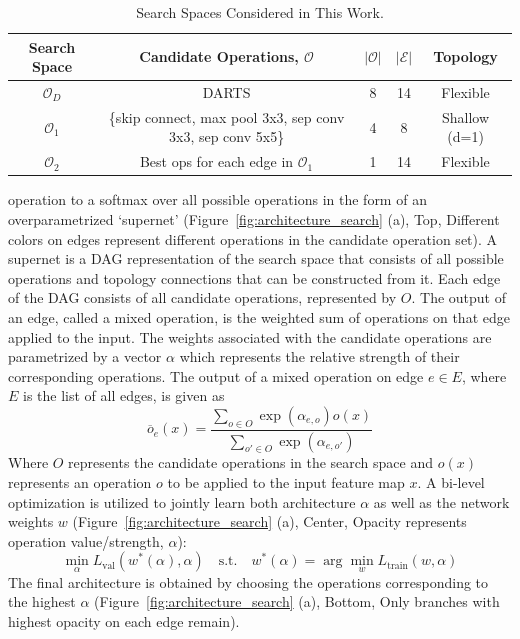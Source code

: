 \documentclass[onecolumn]{IEEEtran}
\begin{document}
\begin{table}[ht]
	\centering
	\caption{Search Spaces Considered in This Work.}
	\label{tab:search_spaces}
	\begin{tabular}{ccccc}
		\hline
		Search Space & Candidate Operations, $\mathcal{O}$ & $\left|\mathcal{O}\right|$ & $\left|\mathcal{E}\right|$ & Topology\\
		\hline
		$\mathcal{O}_D$ & DARTS \cite{Liu2018} & 8 & 14 & Flexible\\
		$\mathcal{O}_1$ & \{skip connect, max pool 3x3, sep conv 3x3, sep conv 5x5\} & 4 & 8 & Shallow (d=1)\\ 
		$\mathcal{O}_2$ & Best ops for each edge in $\mathcal{O}_1$ & 1 & 14 & Flexible\\ \hline
		\end{tabular}
	\end{table}
 
 operation to a softmax over all possible operations in the form of an overparametrized ‘supernet’ (Figure~\ref{fig:architecture_search} (a), Top, Different colors on edges represent different operations in the candidate operation set). A supernet is a DAG representation of the search space that consists of all possible operations and topology connections that can be constructed from it. Each edge of the DAG consists of all candidate operations, represented by \( O \). The output of an edge, called a mixed operation, is the weighted sum of operations on that edge applied to the input. The weights associated with the candidate operations are parametrized by a vector \( \alpha \) which represents the relative strength of their corresponding operations. The output of a mixed operation on edge \( e \in E \), where \( E \) is the list of all edges, is given as
\begin{equation}
\overline{o}_e(x) = \frac{\sum_{o \in O} \exp(\alpha_{e,o}) o(x)}{\sum_{o' \in O} \exp(\alpha_{e,o'})}
\label{eq:exp}
\end{equation}
Where \( O \) represents the candidate operations in the search space and \( o(x) \) represents an operation \( o \) to be applied to the input feature map \( x \). A bi-level optimization is utilized to jointly learn both architecture \( \alpha \) as well as the network weights \( w \) (Figure~\ref{fig:architecture_search} (a), Center, Opacity represents operation value/strength, \( \alpha \)):
\begin{equation}
\min_{\alpha} L_{\text{val}}(w^*(\alpha), \alpha) \quad \text{s.t.} \quad w^*(\alpha) = \arg\min_{w} L_{\text{train}}(w, \alpha)
\label{eq:arg}
\end{equation}
The final architecture is obtained by choosing the operations corresponding to the highest \( \alpha \) (Figure~\ref{fig:architecture_search} (a), Bottom, Only branches with highest opacity on each edge remain).
\end{document}

